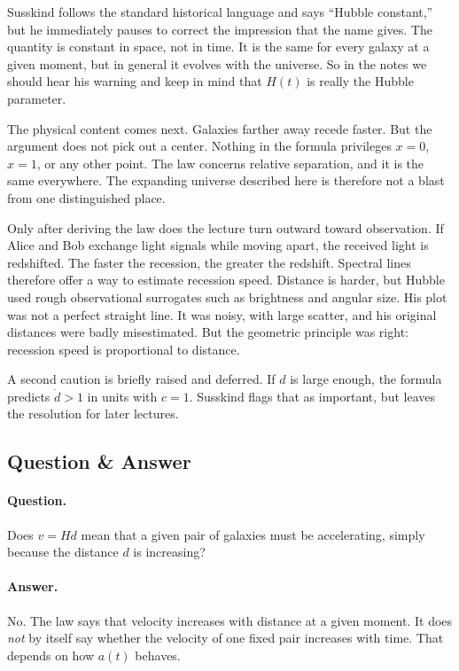 Susskind follows the standard historical language and says ``Hubble constant,'' but he immediately pauses to correct the impression that the name gives. The quantity is constant in space, not in time. It is the same for every galaxy at a given moment, but in general it evolves with the universe. So in the notes we should hear his warning and keep in mind that \(H(t)\) is really the Hubble parameter.

The physical content comes next. Galaxies farther away recede faster. But the argument does not pick out a center. Nothing in the formula privileges \(x=0\), \(x=1\), or any other point. The law concerns relative separation, and it is the same everywhere. The expanding universe described here is therefore not a blast from one distinguished place.

Only after deriving the law does the lecture turn outward toward observation. If Alice and Bob exchange light signals while moving apart, the received light is redshifted. The faster the recession, the greater the redshift. Spectral lines therefore offer a way to estimate recession speed. Distance is harder, but Hubble used rough observational surrogates such as brightness and angular size. His plot was not a perfect straight line. It was noisy, with large scatter, and his original distances were badly misestimated. But the geometric principle was right: recession speed is proportional to distance.

A second caution is briefly raised and deferred. If \(d\) is large enough, the formula predicts \(\dot d>1\) in units with \(c=1\). Susskind flags that as important, but leaves the resolution for later lectures.

\subsection{Question \& Answer}

\paragraph{Question.} Does \(v=Hd\) mean that a given pair of galaxies must be accelerating, simply because the distance \(d\) is increasing?

\paragraph{Answer.} No. The law says that velocity increases with distance at a given moment. It does \emph{not} by itself say whether the velocity of one fixed pair increases with time. That depends on how \(a(t)\) behaves.

